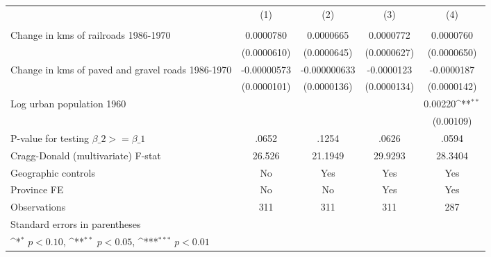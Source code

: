 {
\def\sym#1{\ifmmode^{#1}\else\(^{#1}\)\fi}
\begin{tabular}{l*{4}{c}}
\hline\hline
                &\multicolumn{1}{c}{(1)}&\multicolumn{1}{c}{(2)}&\multicolumn{1}{c}{(3)}&\multicolumn{1}{c}{(4)}\\
                &\multicolumn{1}{c}{}&\multicolumn{1}{c}{}&\multicolumn{1}{c}{}&\multicolumn{1}{c}{}\\
\hline
Change in kms of railroads 1986-1970&0.0000780         &0.0000665         &0.0000772         &0.0000760         \\
                &(0.0000610)         &(0.0000645)         &(0.0000627)         &(0.0000650)         \\
[1em]
Change in kms of paved and gravel roads 1986-1970&-0.00000573         &-0.000000633         &-0.0000123         &-0.0000187         \\
                &(0.0000101)         &(0.0000136)         &(0.0000134)         &(0.0000142)         \\
[1em]
Log urban population 1960&                  &                  &                  &  0.00220\sym{**} \\
                &                  &                  &                  &(0.00109)         \\
\hline
P-value for testing $\beta\_{2} >= \beta\_{1}$&    .0652         &    .1254         &    .0626         &    .0594         \\
Cragg-Donald (multivariate) F-stat&   26.526         &  21.1949         &  29.9293         &  28.3404         \\
Geographic controls&       No         &      Yes         &      Yes         &      Yes         \\
Province FE     &       No         &       No         &      Yes         &      Yes         \\
Observations    &      311         &      311         &      311         &      287         \\
\hline\hline
\multicolumn{5}{l}{\footnotesize Standard errors in parentheses}\\
\multicolumn{5}{l}{\footnotesize \sym{*} \(p<0.10\), \sym{**} \(p<0.05\), \sym{***} \(p<0.01\)}\\
\end{tabular}
}
